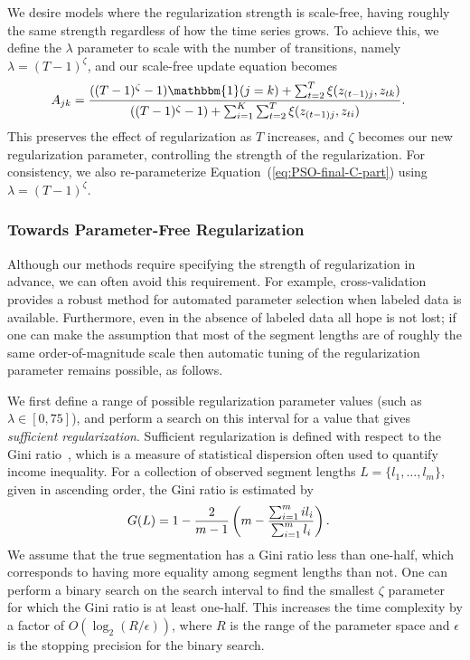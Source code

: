 \documentclass[letterpaper]{article}
\begin{document}
We desire models where the regularization strength is scale-free, having roughly the same strength regardless of how the time series grows. To achieve this, we define the $\lambda$ parameter to scale with the number of transitions, namely $\lambda = (T-1)^\zeta$, and our scale-free update equation becomes
\begin{align}\label{eq:SCALE-FREE-MAP}
  \setlength{\abovedisplayskip}{0pt}
  \setlength{\belowdisplayskip}{0pt}
    A_{jk} &= \frac{((T - 1)^{\zeta}-1){\mathbbm{1}(j = k)} + \sum_{t=2}^{T} \xi(z_{(t-1)j}, z_{tk})}   
    {((T - 1)^{\zeta} - 1) + \sum_{i=1}^{K}\sum_{t=2}^{T} \xi(z_{(t-1)j}, z_{ti})}.
\end{align}
This preserves the effect of regularization as $T$ increases, and $\zeta$
becomes our new regularization parameter, controlling the strength of the
regularization. For consistency, we also re-parameterize
Equation~(\ref{eq:PSO-final-C-part}) using $\lambda = (T-1)^\zeta$.

\subsubsection{Towards Parameter-Free Regularization}\label{sec:param-free}

Although our methods require specifying the strength of regularization in advance, we can often avoid this requirement. For example, cross-validation provides a robust method for automated parameter selection when labeled data is available. Furthermore, even in the absence of labeled data all hope is not lost; if one can make the assumption that most of the segment lengths are of roughly the same order-of-magnitude scale then automatic tuning of the regularization parameter remains possible, as follows.

We first define a range of possible regularization parameter values (such as
$\lambda \in [0, 75]$), and perform a search on this interval for a value that
gives \emph{sufficient regularization}. Sufficient regularization is defined
with respect to the Gini ratio~\cite{gini1936,wiki:1}, which is a measure of
statistical dispersion often used to quantify income inequality. For a
collection of observed segment lengths $L = \{l_1, \ldots, l_m\}$, given in
ascending order, the Gini ratio is estimated by
\begin{align*}
  \setlength{\abovedisplayskip}{0pt}
  \setlength{\belowdisplayskip}{0pt}
    G(L) &= 1 - \frac{2}{m-1}\left(m - \frac{\sum_{i=1}^{m} i l_i}{\sum_{i=1}^{m} l_i}\right).
\end{align*}
We assume that the true segmentation has a Gini ratio less than
one-half, which corresponds to having more equality among segment lengths than
not. One can perform a binary search on the search interval to find the smallest
$\zeta$ parameter for which the Gini ratio is at least one-half. This increases
the time complexity by a factor of $O(\log_2 (R / \epsilon))$, where $R$ is the
range of the parameter space and $\epsilon$ is the stopping precision for the binary search.
\end{document}
